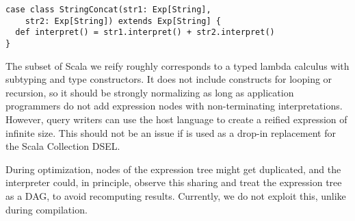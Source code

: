 \begin{lstlisting}
case class StringConcat(str1: Exp[String],
    str2: Exp[String]) extends Exp[String] {
  def interpret() = str1.interpret() + str2.interpret()
}
\end{lstlisting}

The subset of Scala we reify roughly corresponds to a typed lambda calculus with subtyping and type constructors. It does not include constructs for looping or recursion, so it should be strongly normalizing as long as application programmers do not add expression nodes with non-terminating interpretations. However, query writers can use the host language to create a reified expression of infinite size. This should not be an issue if {\LoS} is used as a drop-in replacement for the Scala Collection DSEL.

During optimization, nodes of the expression tree might get duplicated, and the
interpreter could, in principle, observe this sharing and treat the expression
tree as a DAG, to avoid recomputing results. Currently, we do not exploit this,
unlike during compilation.


